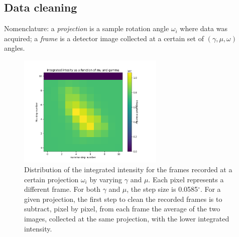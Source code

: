 \documentclass[11pt]{scrartcl}
\begin{document}
\subsection{Data cleaning}
\label{subs:data_cleaning}

Nomenclature: a {\emph{projection}} is a sample rotation angle $\omega_i$ where data was acquired; a {\emph{frame}} is a detector image collected at a certain set of $(\gamma, \mu, \omega)$ angles.

\begin{figure}[h]
    \centering
    \includegraphics[width=0.62\textwidth]{Distr_I_int}
    \caption{Distribution of the integrated intensity for the frames recorded at a certain projection $\omega_i$ by varying $\gamma$ and $\mu$. Each pixel represents a different frame. For both $\gamma$ and $\mu$, the step size is 0.0585$^{\circ}$. For a given projection, the first step to clean the recorded frames is to subtract, pixel by pixel, from each frame the average of the two images, collected at the same projection, with the lower integrated intensity.}
    \label{fig:distr_I_int}
\end{figure}
\end{document}
